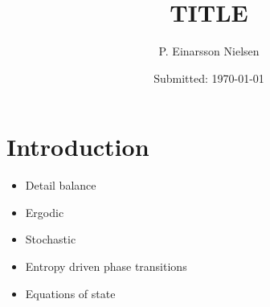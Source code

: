 \documentclass[10pt, twocolumn]{revtex4}    %
\begin{document}
                     


\title{TITLE} 
\date{Submitted: \today{}}
\author{P. Einarsson Nielsen}

\begin{abstract}
	\lipsum[1]

\end{abstract}

\maketitle
\thispagestyle{plain} %



\section{Introduction} \label{s:intro}

\begin{itemize}
	\item Detail balance
	\item Ergodic
	\item Stochastic
	\item Entropy driven phase transitions
	\item Equations of state
	
\end{itemize}


\end{document}
